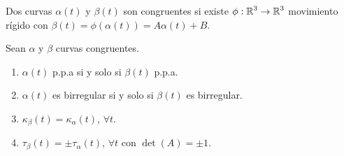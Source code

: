 \begin{definition}
Dos curvas $\displaystyle \alpha\left(t\right) $ y $\displaystyle \beta\left(t\right) $ son congruentes si existe $\displaystyle \phi:\mathbb{R}^{3} \to \mathbb{R}^{3} $ movimiento rígido con $\displaystyle \beta\left(t\right)=\phi\left(\alpha\left(t\right)\right)=A\alpha\left(t\right) + B $.
\end{definition}
\begin{lema}
	Sean $\displaystyle \alpha  $ y $\displaystyle \beta  $ curvas congruentes. 
\begin{enumerate}
\item $\displaystyle \alpha\left(t\right) $ p.p.a si y solo si $\displaystyle \beta\left(t\right) $ p.p.a. 
\item $\displaystyle \alpha\left(t\right) $ es birregular si y solo si $\displaystyle \beta\left(t\right) $ es birregular. 
\item $\displaystyle \kappa_{\beta }\left(t\right)=\kappa_{\alpha }\left(t\right) $, $\displaystyle \forall t $. 
\item $\displaystyle \tau_{\beta }\left(t\right)=\pm \tau_{\alpha }\left(t\right) $, $\displaystyle \forall t $ con $\displaystyle \det\left(A\right)=\pm 1 $. 
\end{enumerate}
\end{lema}
